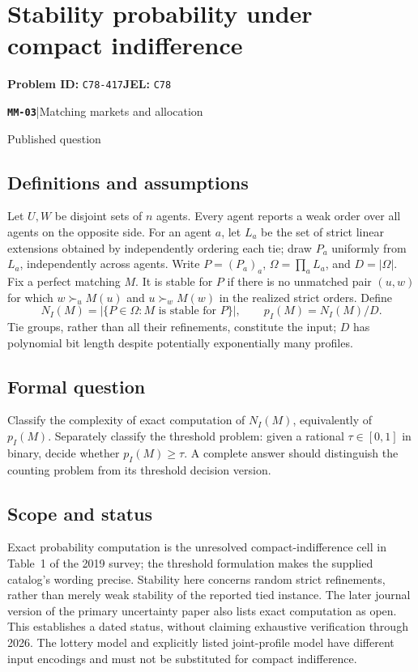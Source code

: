 \documentclass[11pt,a4paper]{article}
\newcommand{\entrymeta}[3]{{\sffamily\small\color{muted}\textbf{\texttt{#1}}\quad|\quad #2\par #3\par}}
\begin{document}
\section*{Stability probability under compact indifference}
\textbf{Problem ID:} \texttt{C78-417}\quad \textbf{JEL:} \texttt{C78}\par
\label{problem:OP-0544}
\label{beyond:MM-03}
\entrymeta{MM-03}{Matching markets and allocation}{Published question}
\subsection*{Definitions and assumptions}
Let $U,W$ be disjoint sets of $n$ agents. Every agent reports a weak order over all agents on the opposite side. For an agent $a$, let $L_a$ be the set of strict linear extensions obtained by independently ordering each tie; draw $P_a$ uniformly from $L_a$, independently across agents. Write $P=(P_a)_a$, $\Omega=\prod_a L_a$, and $D=|\Omega|$. Fix a perfect matching $M$. It is stable for $P$ if there is no unmatched pair $(u,w)$ for which $w\succ_u M(u)$ and $u\succ_w M(w)$ in the realized strict orders. Define
\[
 N_I(M)=|\{P\in\Omega:M\text{ is stable for }P\}|,
 \qquad p_I(M)=N_I(M)/D.
\]
Tie groups, rather than all their refinements, constitute the input; $D$ has polynomial bit length despite potentially exponentially many profiles.
\subsection*{Formal question}
Classify the complexity of exact computation of $N_I(M)$, equivalently of $p_I(M)$. Separately classify the threshold problem: given a rational $\tau\in[0,1]$ in binary, decide whether $p_I(M)\ge\tau$. A complete answer should distinguish the counting problem from its threshold decision version.
\subsection*{Scope and status}
Exact probability computation is the unresolved compact-indifference cell in Table~1 of the 2019 survey; the threshold formulation makes the supplied catalog's wording precise. Stability here concerns random strict refinements, rather than merely weak stability of the reported tied instance. The later journal version of the primary uncertainty paper also lists exact computation as open. This establishes a dated status, without claiming exhaustive verification through 2026. The lottery model and explicitly listed joint-profile model have different input encodings and must not be substituted for compact indifference.
\end{document}
